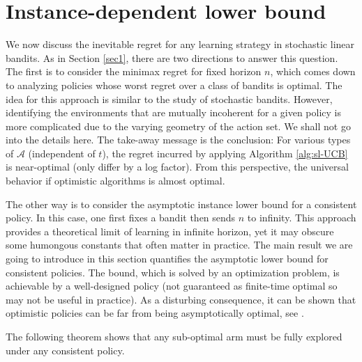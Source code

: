 \documentclass[10pt, openright]{book}
\numberwithin{equation}{section}
\theoremstyle{plain}
\theoremstyle{definition}
\begin{document}
\section{Instance-dependent lower bound}
We now discuss the inevitable regret for any learning strategy in stochastic linear bandits. As in Section \ref{sec1}, there are two directions to answer this question.  The first is to consider the minimax regret for fixed horizon $n$, which comes down to analyzing policies whose worst regret over a class of bandits is optimal. The idea for this approach is similar to the study of stochastic bandits. However, identifying the environments that are mutually incoherent for a given policy is more complicated due to the varying geometry of the action set. We shall not go into the details here. The take-away message is the conclusion: For various types of $\mathcal A$ (independent of $t$), the regret incurred by applying Algorithm \ref{alg:sl-UCB} is near-optimal (only differ by a log factor). From this perspective, the universal behavior if optimistic algorithms is almost optimal. 

The other way is to consider the asymptotic instance lower bound for a consistent policy.  In this case, one first fixes a bandit then sends $n$ to infinity. This approach provides a theoretical limit of learning in infinite horizon, yet it may obscure some humongous constants that often matter in practice. The main result we are going to introduce in this section quantifies the asymptotic lower bound for consistent policies. The bound, which is solved by an optimization problem, is achievable by a well-designed policy (not guaranteed as finite-time optimal so may not be useful in practice).  As a disturbing consequence, it can be shown that optimistic policies can be far from being asymptotically optimal, see \cite{lattimore2016end}. 

The following theorem shows that any sub-optimal arm must be fully explored under any consistent policy. 
\end{document}
